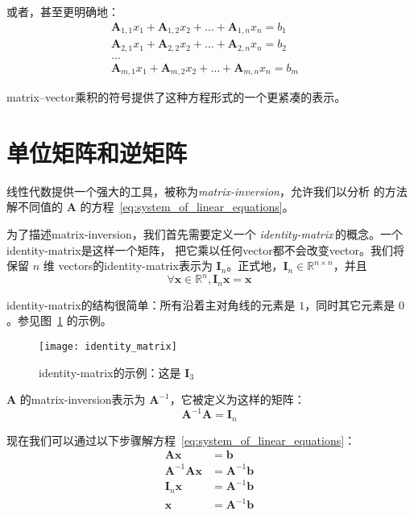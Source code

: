 或者，甚至更明确地：
\begin{align}
  \pmb{A}_{1,1}x_1 + \pmb{A}_{1,2}x_2 + \ldots + \pmb{A}_{1,n}x_n = b_1 \\
  \pmb{A}_{2,1}x_1 + \pmb{A}_{2,2}x_2 + \ldots + \pmb{A}_{2,n}x_n = b_2 \\
  \ldots & \\
  \pmb{A}_{m,1}x_1 + \pmb{A}_{m,2}x_2 + \ldots + \pmb{A}_{m,n}x_n = b_m
\end{align}

\gls*{matrix}--\gls*{vector}乘积的符号提供了这种方程形式的一个更紧凑的表示。

\section{单位矩阵和逆矩阵}
\label{sec:identity_and_inverse_matrices}

线性代数提供一个强大的工具，被称为\emph{\gls{matrix-inversion}}，允许我们以分析
的方法解不同值的 $\pmb{A}$ 的方程~\ref{eq:system_of_linear_equations}。

为了描述\gls*{matrix-inversion}，我们首先需要定义一个
\emph{\gls{identity-matrix}}\,的概念。一个\gls*{identity-matrix}是这样一个矩阵，
把它乘以任何\gls*{vector}都不会改变\gls*{vector}。我们将保留 $n$ 维
\gls*{vectors}的\gls*{identity-matrix}表示为 $\pmb{I}_n$。正式地，$\pmb{I}_n \in \mathbb{R}^{n \times n}$，并且
\begin{equation}
  \forall \pmb{x} \in \mathbb{R}^n, \pmb{I}_n\pmb{x} = \pmb{x}
  \label{eq:definition_of_identity_matrix}
\end{equation}

\gls*{identity-matrix}的结构很简单：所有沿着主对角线的元素是 $1$，同时其它元素是
$0$。参见图~\ref{fig:identity_matrix} 的示例。

\begin{figure}[h]
  \centering
  \texttt{[image: identity\_matrix]}
  \caption{\gls*{identity-matrix}的示例：这是
    $\pmb{I}_3$\label{fig:identity_matrix}}
\end{figure}

$\pmb{A}$ 的\gls*{matrix-inversion}表示为 $\pmb{A}^{-1}$，它被定义为这样的矩阵：
\begin{equation}
  \pmb{A}^{-1}\pmb{A} = \pmb{I}_n
  \label{eq:matrix-inverse}
\end{equation}

现在我们可以通过以下步骤解方程~\ref{eq:system_of_linear_equations}：
\begin{align}
  \pmb{A}\pmb{x} &= \pmb{b} \\
  \pmb{A}^{-1}\pmb{A}\pmb{x} &= \pmb{A}^{-1}\pmb{b} \\
  \pmb{I}_n\pmb{x} &= \pmb{A}^{-1}\pmb{b} \\
  \pmb{x} &= \pmb{A}^{-1}\pmb{b}
\end{align}


